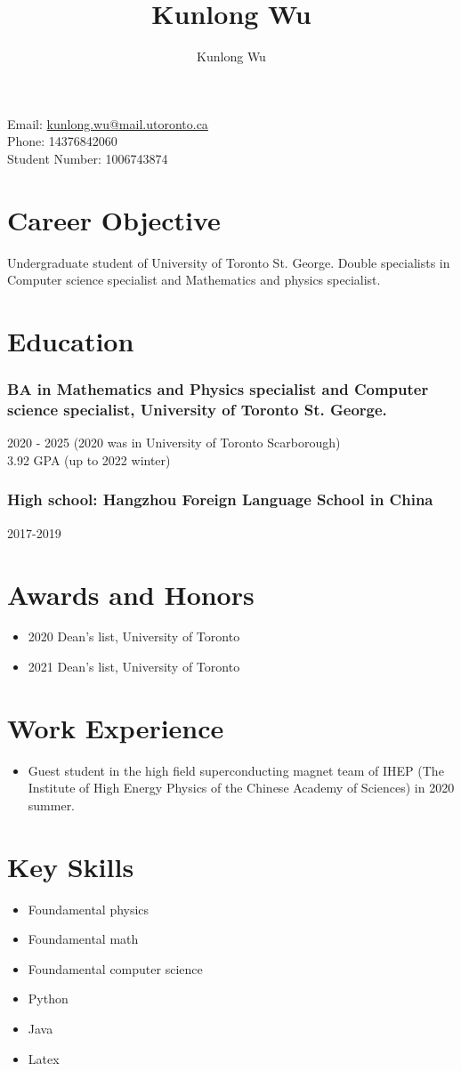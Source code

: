 \documentclass{aq-notes}
\title{Kunlong Wu}
\author{Kunlong Wu}
\begin{document}
    Email: \url{kunlong.wu@mail.utoronto.ca}\\
    Phone: 14376842060\\
    Student Number: 1006743874
    \section*{Career Objective}
    Undergraduate student of University of Toronto St. George. Double specialists in Computer science specialist and Mathematics and physics specialist.
    \section*{Education}
    \subsubsection*{BA in {Mathematics and Physics specialist} and {Computer science specialist}, University of Toronto St. George.}
    2020 - 2025 (2020 was in University of Toronto Scarborough)\\
    3.92 GPA (up to 2022 winter)
    \subsubsection*{High school: Hangzhou Foreign Language School in China}
    2017-2019

    \section*{Awards and Honors}
    \begin{itemize}
        \item 2020 Dean's list, University of Toronto
        \item 2021 Dean's list, University of Toronto
    \end{itemize}

    \section*{Work Experience}

    \begin{itemize}
        \item Guest student in the high field superconducting magnet team of IHEP (The Institute of High Energy Physics of the Chinese Academy of Sciences) in 2020 summer.
    \end{itemize}
    \section*{Key Skills}
    \begin{itemize}
        \item Foundamental physics
        \item Foundamental math
        \item Foundamental computer science
        \item Python
        \item Java
        \item Latex
    \end{itemize}
\end{document}
